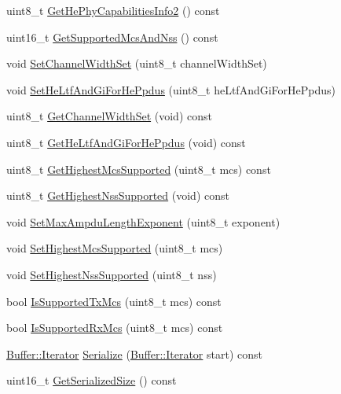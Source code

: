 \begin{DoxyCompactItemize}
\item 
uint8\+\_\+t \hyperlink{classns3_1_1HeCapabilities_a2b1c3b60f2b6499d06eaa7afb87d760a}{Get\+He\+Phy\+Capabilities\+Info2} () const 
\item 
uint16\+\_\+t \hyperlink{classns3_1_1HeCapabilities_aecbac8dccdabd9ba641817e9f76ff334}{Get\+Supported\+Mcs\+And\+Nss} () const 
\item 
void \hyperlink{classns3_1_1HeCapabilities_ac9aad47e945ee626012531949c76b7dc}{Set\+Channel\+Width\+Set} (uint8\+\_\+t channel\+Width\+Set)
\item 
void \hyperlink{classns3_1_1HeCapabilities_acd7bb720989d9048a8a375464fc51845}{Set\+He\+Ltf\+And\+Gi\+For\+He\+Ppdus} (uint8\+\_\+t he\+Ltf\+And\+Gi\+For\+He\+Ppdus)
\item 
uint8\+\_\+t \hyperlink{classns3_1_1HeCapabilities_a40936cc81b1b966dea14e33c445122c9}{Get\+Channel\+Width\+Set} (void) const 
\item 
uint8\+\_\+t \hyperlink{classns3_1_1HeCapabilities_a4bb535bd7883416ab5675246e6813e08}{Get\+He\+Ltf\+And\+Gi\+For\+He\+Ppdus} (void) const 
\item 
uint8\+\_\+t \hyperlink{classns3_1_1HeCapabilities_a370651ef9b7a573cd1c4b81d997ee341}{Get\+Highest\+Mcs\+Supported} (uint8\+\_\+t mcs) const 
\item 
uint8\+\_\+t \hyperlink{classns3_1_1HeCapabilities_ab79cdb19b34ac3e5ad517a58cbf4b5ca}{Get\+Highest\+Nss\+Supported} (void) const 
\item 
void \hyperlink{classns3_1_1HeCapabilities_aa4d4d881a5ef87e440f67ec71d2c9136}{Set\+Max\+Ampdu\+Length\+Exponent} (uint8\+\_\+t exponent)
\item 
void \hyperlink{classns3_1_1HeCapabilities_ae295efd88be1be35c6b324c02a7ebc2c}{Set\+Highest\+Mcs\+Supported} (uint8\+\_\+t mcs)
\item 
void \hyperlink{classns3_1_1HeCapabilities_a7757bb2517113e7b8489af53ae1e7d72}{Set\+Highest\+Nss\+Supported} (uint8\+\_\+t nss)
\item 
bool \hyperlink{classns3_1_1HeCapabilities_ab69a3a2883adfb2c99f743ad251f0492}{Is\+Supported\+Tx\+Mcs} (uint8\+\_\+t mcs) const 
\item 
bool \hyperlink{classns3_1_1HeCapabilities_a977d21745aff5da8ea2279e34bc9864e}{Is\+Supported\+Rx\+Mcs} (uint8\+\_\+t mcs) const 
\item 
\hyperlink{classns3_1_1Buffer_1_1Iterator}{Buffer\+::\+Iterator} \hyperlink{classns3_1_1HeCapabilities_ac7525eb597bf0308f0ea637db53f8295}{Serialize} (\hyperlink{classns3_1_1Buffer_1_1Iterator}{Buffer\+::\+Iterator} start) const 
\item 
uint16\+\_\+t \hyperlink{classns3_1_1HeCapabilities_ac79e1c2719f4f69bb30296ceeac6e3e4}{Get\+Serialized\+Size} () const 
\end{DoxyCompactItemize}
